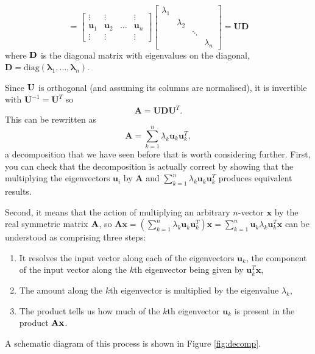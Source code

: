  \[
 = 
 \left[\begin{array}{cccc}
 \vdots & \vdots & & \vdots  \\
 \mathbf {u}_1 & \mathbf {u}_2 & \ldots & \mathbf {u}_n \\
\vdots & \vdots & & \vdots  
 \end{array}\right]
 \left[\begin{array}{cccc}
 \lambda_1 &  & &   \\
  & \lambda_2 &  &  \\
 &  & \ddots & \\
 &&&\lambda_n  
 \end{array}\right] 
 = \mathbf{UD}
   \]
where $\bf D$ is the diagonal matrix with eigenvalues on the diagonal, $\mathbf D = \mathrm{diag}(\mathbf \lambda_1,\ldots, \mathbf \lambda_n)$.  



Since $\bf U$ is orthogonal (and assuming its columns are normalised), it is invertible with $\mathbf U^{-1} = \mathbf U^T $ so 
\[\mathbf A = \mathbf{UDU}^T. \]
This can be rewritten as 
\[\mathbf A = \sum_{k = 1}^n \lambda_k \mathbf u_k  \mathbf u_k^T, \]
a decomposition that we have seen before that is worth considering further.  First, you can check that the decomposition is actually correct by showing that  the multiplying  the  eigenvectors $\mathbf u_i$ by  $\mathbf A$ and $\sum_{k = 1}^n \lambda_k \mathbf u_k  \mathbf u_k^T$ produces equivalent results.

Second, it means that the action of multiplying an arbitrary $n$-vector $\mathbf x$ by the real symmetric matrix $\bf A$, so $\mathbf {Ax} = (\sum_{k = 1}^n \lambda_k \mathbf u_k  \mathbf u_k^T)\mathbf x = \sum_{k = 1}^n  \mathbf u_k  \lambda_k \mathbf u_k^T \mathbf x  $ can be understood as comprising three steps:
\begin{enumerate}
\item It resolves the input vector along each of the eigenvectors $\mathbf u_k$, the component of the input vector along the $k$th eigenvector being given by $\mathbf u^T_k \mathbf x$,
\item The amount along the $k$th eigenvector is multiplied by the eigenvalue $\lambda_k$,
\item The product tells us how much of the $k$th eigenvector $\mathbf u_k$ is present in the product $\bf Ax$.
\end{enumerate}
A schematic diagram of this process is shown in Figure \ref{fig:decomp}.


